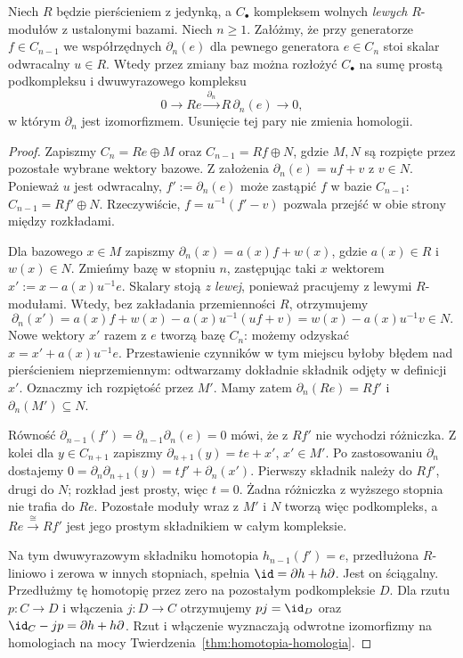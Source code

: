 \begin{twierdzenie}
\label{thm:kasowanie-pary}
Niech $R$ będzie pierścieniem z jedynką,
a $C_\bullet$ kompleksem wolnych \emph{lewych}
$R$-modułów z ustalonymi bazami.
Niech $n\geq1$. Załóżmy, że
przy generatorze $f\in C_{n-1}$
we współrzędnych $\partial_n(e)$ dla pewnego
generatora $e\in C_n$ stoi skalar
odwracalny $u\in R$.
Wtedy przez zmiany baz można rozłożyć
$C_\bullet$ na sumę prostą
podkompleksu i dwuwyrazowego kompleksu
\[
 0\longrightarrow R e
 \xrightarrow{\ \partial_n\ }R\,\partial_n(e)
 \longrightarrow0,
\]
w którym $\partial_n$ jest izomorfizmem.
Usunięcie tej pary nie zmienia homologii.
\end{twierdzenie}
\begin{proof}
Zapiszmy
$C_n=R e\oplus M$ oraz
$C_{n-1}=R f\oplus N$, gdzie
$M,N$ są rozpięte przez pozostałe
wybrane wektory bazowe.
Z założenia
$\partial_n(e)=u f+v$ z $v\in N$.
Ponieważ $u$ jest odwracalny,
$f':=\partial_n(e)$ może zastąpić $f$
w bazie $C_{n-1}$:
$C_{n-1}=R f'\oplus N$.
Rzeczywiście, $f=u^{-1}(f'-v)$
pozwala przejść w obie strony
między rozkładami.

Dla bazowego $x\in M$ zapiszmy
$\partial_n(x)=a(x)f+w(x)$,
gdzie $a(x)\in R$ i $w(x)\in N$.
Zmieńmy bazę w stopniu $n$,
zastępując taki $x$ wektorem
$x':=x-a(x)u^{-1}e$. Skalary stoją
\emph{z lewej}, ponieważ pracujemy z lewymi
$R$-modułami. Wtedy, bez zakładania
przemienności $R$, otrzymujemy
\[
 \partial_n(x')
 =a(x)f+w(x)-a(x)u^{-1}(uf+v)
 =w(x)-a(x)u^{-1}v\in N.
\]
Nowe wektory $x'$ razem z $e$
tworzą bazę $C_n$: możemy odzyskać
$x=x'+a(x)u^{-1}e$.
Przestawienie czynników w tym miejscu byłoby błędem
nad pierścieniem nieprzemiennym: odtwarzamy dokładnie
składnik odjęty w definicji $x'$.
Oznaczmy ich rozpiętość przez $M'$.
Mamy zatem $\partial_n(Re)=Rf'$
i $\partial_n(M')\subseteq N$.

Równość $\partial_{n-1}(f')=\partial_{n-1}\partial_n(e)=0$
mówi, że z $Rf'$ nie wychodzi
różniczka. Z kolei dla $y\in C_{n+1}$
zapiszmy $\partial_{n+1}(y)=t e+x'$,
$x'\in M'$. Po zastosowaniu $\partial_n$
dostajemy
$0=\partial_n\partial_{n+1}(y)=t f'+\partial_n(x')$.
Pierwszy składnik należy do $Rf'$,
drugi do $N$; rozkład jest prosty,
więc $t=0$. Żadna różniczka
z wyższego stopnia nie trafia do $Re$.
Pozostałe moduły wraz z $M'$ i $N$
tworzą więc podkompleks, a
$Re\xrightarrow{\cong}Rf'$
jest jego prostym składnikiem
w całym kompleksie.

Na tym dwuwyrazowym składniku
homotopia $h_{n-1}(f')=e$,
przedłużona $R$-liniowo i zerowa
w innych stopniach,
spełnia $\id=\partial h+h\partial$.
Jest on ściągalny. Przedłużmy tę homotopię przez zero na
pozostałym podkompleksie $D$. Dla rzutu $p:C\to D$ i włączenia
$j:D\to C$ otrzymujemy $pj=\id_D$ oraz
$\id_C-jp=\partial h+h\partial$. Rzut i włączenie
wyznaczają odwrotne izomorfizmy
na homologiach na mocy
Twierdzenia~\ref{thm:homotopia-homologia}.
\end{proof}

